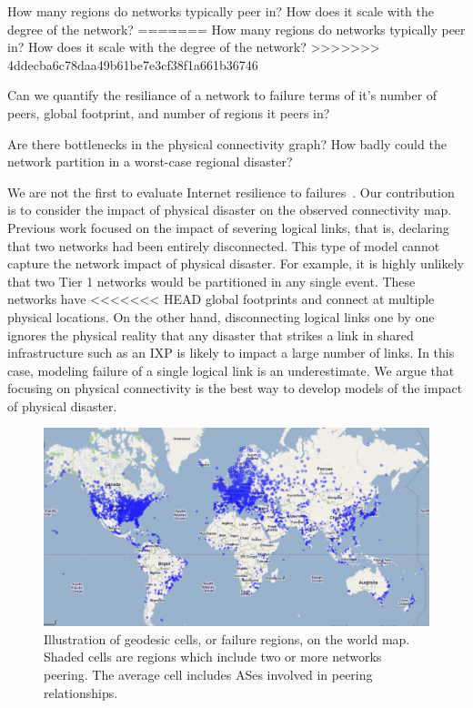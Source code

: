 \eat{
}

 How many regions do networks typically peer in? How does it scale with the degree of the network?
=======
 How many regions do networks
typically peer in? How does it scale with the degree of the network?
>>>>>>> 4ddecba6c78daa49b61be7e3cf38f1a661b36746

 Can we quantify the resiliance of a
network to failure terms of it's number of peers, global footprint, and number
of regions it peers in?

 Are there bottlenecks in the
physical connectivity graph? How badly could the network partition in a
worst-case regional disaster?

We are not the first to evaluate Internet resilience to
failures~\cite{michigan, measuringresilience, resilience-under-BGP,
resilience-complex-networks}.  Our contribution is to consider the impact of
physical disaster on the observed connectivity map.  Previous work focused on
the impact of severing logical links, that is, declaring that two networks had
been entirely disconnected.  This type of model cannot capture the network
impact of physical disaster.  For example, it is highly unlikely that two Tier
1 networks would be partitioned in any single event.  These networks have
<<<<<<< HEAD
global footprints and connect at multiple physical locations.
  On the other hand, disconnecting logical links
one by one ignores the physical reality that any disaster that strikes a link
in shared infrastructure such as an IXP is likely to impact a large number of
links.  In this case, modeling failure of a single logical link is an
underestimate.  We argue that focusing on physical connectivity is the best way to
develop models of the impact of physical disaster. 
 
\begin{figure}[htb]
\centering
\includegraphics[width=6in]{world_map.jpg}
\caption[]{\label{fig:worldmap}  Illustration of geodesic cells, or failure regions, on the world map. Shaded cells are regions which include two or more networks peering. The average cell includes  ASes involved in  peering relationships.} 
\end{figure}

